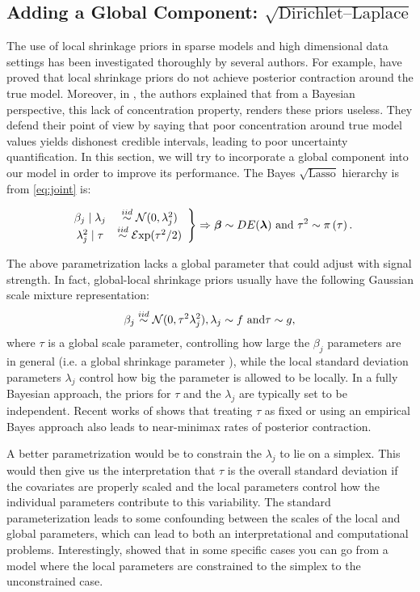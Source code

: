 \documentclass[ba]{imsart}
\def\sql{$\sqrt{\text{Lasso}}$}
\begin{document}
\subsection{Adding a Global Component: $ \sqrt{\text{Dirichlet--Laplace}}$}

The use of local shrinkage priors in sparse models and high dimensional data settings has been investigated thoroughly by several authors. For example, \citep{castillo2015bayesian} have proved that local shrinkage priors do not achieve posterior contraction around the true model. Moreover, in \cite{castillo2015bayesian}, the authors explained that from a Bayesian perspective, this lack of concentration property, renders these priors useless. They defend their point of view by saying that poor concentration around true model values yields dishonest credible intervals, leading to poor uncertainty quantification. In this section, we will try to incorporate a global component into our model in order to improve its performance. The Bayes \sql{} hierarchy is from \eqref{eq:joint} is:

\begin{equation} \label{Lasso_prior}
\left.
\begin{array}{cc}
\beta_j \mid \lambda_j & \stackrel{iid}{\sim} \mathcal{N}(0 , \lambda_j^2) \\
\lambda_j^2 \mid \tau & \stackrel{iid}{\sim} \mathcal{E}\mathrm{xp}(\tau^2/2) 
\end{array} \right \} \Rightarrow
\boldsymbol{\beta} \sim DE(\boldsymbol{\lambda}) \text{ and } \tau^2 \sim \pi\left(\tau \right). 
\end{equation}

The above parametrization lacks a global parameter that could adjust with signal strength. In fact, global-local shrinkage priors usually have the following Gaussian scale mixture representation: \[ \beta_j \stackrel{iid}{\sim} \mathcal{N}(0 , \tau^2 \lambda_j^2), \lambda_j \sim f \mbox{ and}  \tau \sim g, \] where $\tau$ is a global scale parameter, controlling how large the $\beta_j$ parameters are in general (\rm{i.e.} a global shrinkage parameter ), while the local standard deviation parameters $\lambda_j$ control how big the parameter is allowed to be locally.  In a fully Bayesian approach, the priors for $\tau$ and the $\lambda_j$ are typically set to be independent.  Recent works of \citet{van2017adaptive} shows that treating $\tau$ as fixed or using an empirical Bayes approach also leads to near-minimax rates of posterior contraction. 

A better parametrization would be to constrain the $\lambda_j$ to lie on a simplex.  This would then give us the interpretation that $\tau$ is the overall standard deviation if the covariates are properly scaled  and the local parameters control how the individual parameters contribute to this variability. The standard parameterization leads to some confounding between the scales of the local and global parameters, which can lead to both an interpretational and computational problems.  Interestingly, \citet{bhattacharya2014dirichlet} showed that in some specific cases you can go from a model where the local parameters are constrained to the simplex to the unconstrained case.
\end{document}
